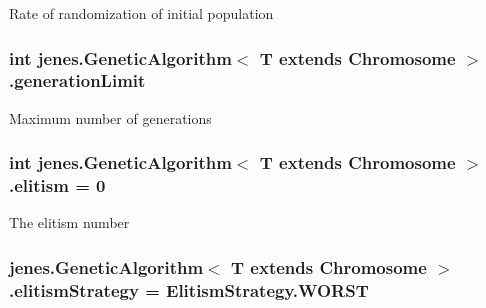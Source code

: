 Rate of randomization of initial population \hypertarget{classjenes_1_1_genetic_algorithm_3_01_t_01extends_01_chromosome_01_4_6677c80cf6ad470a0124fc2fa3051310}{
\subsubsection[generationLimit]{\setlength{\rightskip}{0pt plus 5cm}int jenes.GeneticAlgorithm$<$ T extends Chromosome $>$.{\bf generationLimit}}}
\label{classjenes_1_1_genetic_algorithm_3_01_t_01extends_01_chromosome_01_4_6677c80cf6ad470a0124fc2fa3051310}


Maximum number of generations \hypertarget{classjenes_1_1_genetic_algorithm_3_01_t_01extends_01_chromosome_01_4_c4280b01e7da0ddc049050b19e28b8b9}{
\subsubsection[elitism]{\setlength{\rightskip}{0pt plus 5cm}int jenes.GeneticAlgorithm$<$ T extends Chromosome $>$.{\bf elitism} = 0}}
\label{classjenes_1_1_genetic_algorithm_3_01_t_01extends_01_chromosome_01_4_c4280b01e7da0ddc049050b19e28b8b9}


The elitism number \hypertarget{classjenes_1_1_genetic_algorithm_3_01_t_01extends_01_chromosome_01_4_acba3e1823ba66a2dd6d3c902f8ff719}{
\subsubsection[elitismStrategy]{ jenes.GeneticAlgorithm$<$ T extends Chromosome $>$.{\bf elitismStrategy} = ElitismStrategy.WORST}}
\label{classjenes_1_1_genetic_algorithm_3_01_t_01extends_01_chromosome_01_4_acba3e1823ba66a2dd6d3c902f8ff719}


